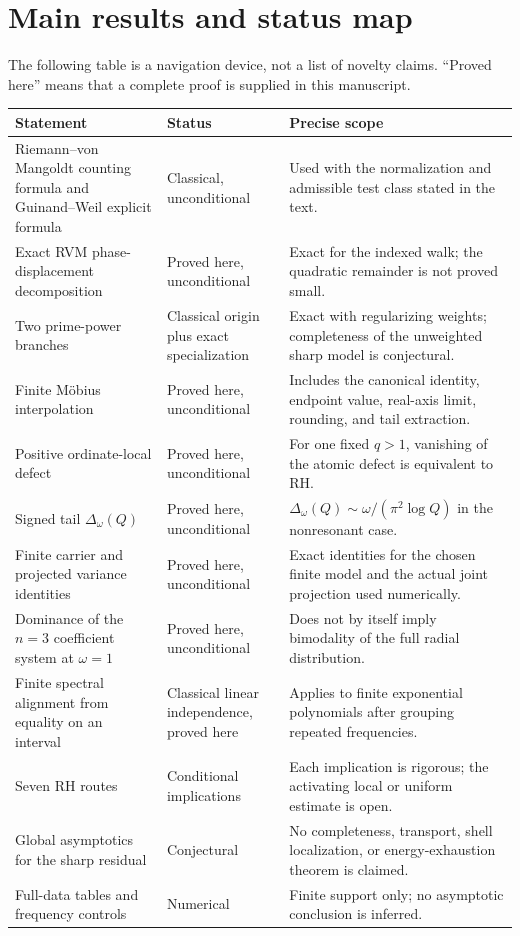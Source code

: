 \documentclass[11pt]{amsart}
\numberwithin{equation}{section}
\theoremstyle{plain}
\theoremstyle{definition}
\theoremstyle{remark}
\newcommand{\1}{\mathbf{1}}
\begin{document}
\section{Main results and status map}
\label{sec:main_results_status_map}

The following table is a navigation device, not a list of novelty claims.
``Proved here'' means that a complete proof is supplied in this manuscript.

\begin{center}
\begin{tabular}{>{\raggedright\arraybackslash}p{}
                >{\raggedright\arraybackslash}p{}
                >{\raggedright\arraybackslash}p{}}
\toprule
Statement & Status & Precise scope \\
\midrule
Riemann--von Mangoldt counting formula and Guinand--Weil explicit formula
& Classical, unconditional
& Used with the normalization and admissible test class stated in the text. \\
Exact RVM phase-displacement decomposition
& Proved here, unconditional
& Exact for the indexed walk; the quadratic remainder is not proved small. \\
Two prime-power branches
& Classical origin plus exact specialization
& Exact with regularizing weights; completeness of the unweighted sharp model is conjectural. \\
Finite Möbius interpolation
& Proved here, unconditional
& Includes the canonical identity, endpoint value, real-axis limit, rounding, and tail extraction. \\
Positive ordinate-local defect
& Proved here, unconditional
& For one fixed \(q>1\), vanishing of the atomic defect is equivalent to RH. \\
Signed tail \(\Delta_\omega(Q)\)
& Proved here, unconditional
& \(\Delta_\omega(Q)\sim\omega/(\pi^2\log Q)\) in the nonresonant case. \\
Finite carrier and projected variance identities
& Proved here, unconditional
& Exact identities for the chosen finite model and the actual joint projection used numerically. \\
Dominance of the \(n=3\) coefficient system at \(\omega=1\)
& Proved here, unconditional
& Does not by itself imply bimodality of the full radial distribution. \\
Finite spectral alignment from equality on an interval
& Classical linear independence, proved here
& Applies to finite exponential polynomials after grouping repeated frequencies. \\
Seven RH routes
& Conditional implications
& Each implication is rigorous; the activating local or uniform estimate is open. \\
Global asymptotics for the sharp residual
& Conjectural
& No completeness, transport, shell localization, or energy-exhaustion theorem is claimed. \\
Full-data tables and frequency controls
& Numerical
& Finite support only; no asymptotic conclusion is inferred. \\
\bottomrule
\end{tabular}
\end{center}
\end{document}
